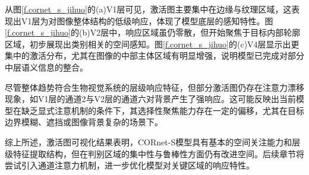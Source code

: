 从图\ref{f.cornet_s_jihuo}的(a)V1层可见，激活图主要集中在边缘与纹理区域，这表现出V1层为对图像整体结构的低级响应，体现了模型底层的感知特性。图\ref{f.cornet_s_jihuo}的(b)V2层中，响应区域虽仍零散，但开始聚焦于目标内部轮廓区域，初步展现出类别相关的空间感知。图\ref{f.cornet_s_jihuo}的(c)V4层显示出更集中的激活分布，尤其在图像的中部主体区域有明显增强，说明模型已完成对部分中层语义信息的整合。

尽管整体趋势符合生物视觉系统的层级响应特征，但部分激活图仍存在注意力漂移现象，如V1层的通道2与V2层的通道六对背景产生了强响应。这可能反映出当前模型在缺乏显式注意机制的条件下，其选择性聚焦能力存在一定的偏移，尤其在目标边界模糊、遮挡或图像背景复杂的场景下。

综上所述，激活图可视化结果表明，CORnet-S模型具有基本的空间关注能力和层级特征提取结构，但在判别区域的集中性与鲁棒性方面仍有改进空间。后续章节将尝试引入通道注意力机制，进一步优化模型对关键区域的响应特性。

